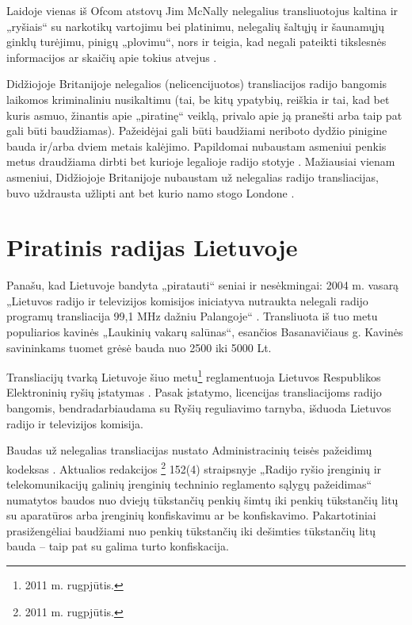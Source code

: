\documentclass[kursinis-darbas]{vukf}
\begin{document}
Laidoje vienas iš \gls{Ofcom} atstovų Jim McNally nelegalius transliuotojus kaltina ir „ryšiais“ su narkotikų vartojimu bei platinimu, nelegalių šaltųjų ir šaunamųjų ginklų turėjimu, pinigų „plovimu“, nors ir teigia, kad negali pateikti tikslesnės informacijos ar skaičių apie tokius atvejus \cite{bbc_radio_4_do_pirates_rule_the_air_waves}.

Didžiojoje Britanijoje nelegalios (nelicencijuotos) transliacijos radijo bangomis laikomos kriminaliniu nusikaltimu (tai, be kitų ypatybių, reiškia ir tai, kad bet kuris asmuo, žinantis apie „piratinę“ veiklą, privalo apie ją pranešti arba taip pat gali būti baudžiamas). Pažeidėjai gali būti baudžiami neriboto dydžio pinigine bauda ir/arba dviem metais kalėjimo. Papildomai nubaustam asmeniui penkis metus draudžiama dirbti bet kurioje legalioje radijo stotyje \cite{ofcom_pirate_radio_fines}. Mažiausiai vienam asmeniui, Didžiojoje Britanijoje nubaustam už nelegalias radijo transliacijas, buvo uždrausta užlipti ant bet kurio namo stogo Londone \cite{ofcom_pirate_radio_rooftop_ban}.


\section{Piratinis radijas Lietuvoje}

Panašu, kad Lietuvoje bandyta „piratauti“ seniai ir nesėkmingai: 2004 m. vasarą „Lietuvos radijo ir televizijos komisijos iniciatyva nutraukta nelegali radijo programų transliacija 99,1 MHz dažniu Palangoje“ \cite{rtk_nelegali_transliacija_palangoje}. Transliuota iš tuo metu populiarios kavinės „Laukinių vakarų salūnas“, esančios Basanavičiaus g. \cite{ve_palangoje_aptikta_nelegali_radijo_stotis} Kavinės savininkams tuomet grėsė bauda nuo 2500 iki 5000 Lt.

Transliacijų tvarką Lietuvoje šiuo metu\footnote{2011 m. rugpjūtis.} reglamentuoja Lietuvos Respublikos Elektroninių ryšių įstatymas \cite{lr_elektroniniu_rysiu_istatymas}. Pasak įstatymo, licencijas transliacijoms radijo bangomis, bendradarbiaudama su Ryšių reguliavimo tarnyba, išduoda Lietuvos radijo ir televizijos komisija.

Baudas už nelegalias transliacijas nustato Administracinių teisės pažeidimų kodeksas \cite{lr_administraciniu_teises_pazeidimu_kodeksas}. Aktualios redakcijos \footnote{2011 m. rugpjūtis.} 152(4) straipsnyje „Radijo ryšio įrenginių ir telekomunikacijų galinių įrenginių techninio reglamento sąlygų pažeidimas“ numatytos baudos nuo dviejų tūkstančių penkių šimtų iki penkių tūkstančių litų su aparatūros arba įrenginių konfiskavimu ar be konfiskavimo. Pakartotiniai prasižengėliai baudžiami nuo penkių tūkstančių iki dešimties tūkstančių litų bauda – taip pat su galima turto konfiskacija.
\end{document}
